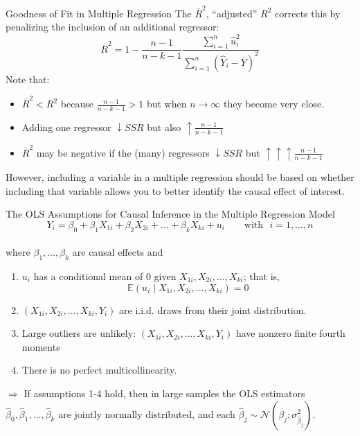 \documentclass[notes,10pt, aspectratio=169]{beamer}
\begin{document}
\begin{frame}{Goodness of Fit in Multiple Regression}
The $\overline{R}^2$,  ``adjusted'' $R^2$ corrects this by penalizing the inclusion of an additional regressor:
\begin{equation*}
    \overline{R}^2 = 1- \frac{n-1}{n-k-1}\frac{\sum_{i=1}^n \hat{u}_i^2}{\sum_{i=1}^n(\hat{Y}_i-\overline{Y})^2}
\end{equation*}
Note that:
\begin{itemize}
    \item $\overline{R}^2<R^2$ because $\frac{n-1}{n-k-1}>1$ but when $n\rightarrow\infty$ they become very close.
    \item Adding one regressor $\downarrow SSR$ but also $\uparrow\frac{n-1}{n-k-1}$
    \item $\overline{R}^2$ may be negative if the (many) regressors $\downarrow SSR$ but $\uparrow\uparrow\uparrow\frac{n-1}{n-k-1}$
\end{itemize}
\vspace{.5cm}
However, including a variable in a multiple regression should be based on whether including that variable allows you to better identify the causal effect of interest.
\end{frame}

\begin{frame}{The OLS Assumptions for Causal Inference
in the Multiple Regression Model}
\begin{equation*}
    Y_i = \beta_{0} + \beta_1 X_{1i} + \beta_2 X_{2i} + ... + \beta_k X_{ki} + u_i \text{~~~~~~with~~} i=1,\dots, n
\end{equation*}\\
\vspace{.5cm}
where $\beta_1, \dots, \beta_k$ are causal effects and\vspace{.5cm}

\begin{enumerate}
    \item $u_i$ has a conditional mean of 0 given $X_{1i}, X_{2i}, \dots, X_{ki}$; that is,
    \begin{equation*}
        \mathbb{E}(u_i \mid X_{1i}, X_{2i}, \dots, X_{ki})=0
    \end{equation*}
    \item $(X_{1i}, X_{2i}, \dots, X_{ki}, Y_i)$ are i.i.d. draws from their joint distribution.
    \item Large outliers are unlikely: $(X_{1i}, X_{2i}, \dots, X_{ki}, Y_i)$ have nonzero finite fourth moments
    \item There is no perfect multicollinearity.
\end{enumerate}
\vspace{.5cm}
$\Rightarrow$ If assumptions 1-4 hold, then in large samples the OLS estimators $\hat{\beta}_0, \hat{\beta}_1, \dots, \hat{\beta}_k$ are jointly normally distributed, and each $\hat{\beta}_j\sim \mathcal{N}(\beta_j; \sigma^2_{\hat{\beta}_j})$.
\end{frame}
\end{document}
